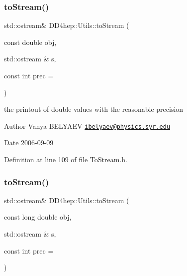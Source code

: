 \subsubsection{\texorpdfstring{to\+Stream()}{toStream()}\hspace{0.1cm}{\footnotesize\ttfamily [6/22]}}
{\footnotesize\ttfamily std\+::ostream\& D\+D4hep\+::\+Utils\+::to\+Stream (\begin{DoxyParamCaption}\item[{const double}]{obj,  }\item[{std\+::ostream \&}]{s,  }\item[{const int}]{prec = {} }\end{DoxyParamCaption})\hspace{0.3cm}{\ttfamily [inline]}}



the printout of double values with the reasonable precision 

\begin{DoxyAuthor}{Author}
Vanya B\+E\+L\+Y\+A\+EV \href{mailto:ibelyaev@physics.syr.edu}{\tt ibelyaev@physics.\+syr.\+edu} 
\end{DoxyAuthor}
\begin{DoxyDate}{Date}
2006-\/09-\/09 
\end{DoxyDate}


Definition at line 109 of file To\+Stream.\+h.

\hypertarget{namespace_d_d4hep_1_1_utils_ac4881c1c93e7105a9f241b2664679409}{}\label{namespace_d_d4hep_1_1_utils_ac4881c1c93e7105a9f241b2664679409} 
\subsubsection{\texorpdfstring{to\+Stream()}{toStream()}\hspace{0.1cm}{\footnotesize\ttfamily [7/22]}}
{\footnotesize\ttfamily std\+::ostream\& D\+D4hep\+::\+Utils\+::to\+Stream (\begin{DoxyParamCaption}\item[{const long double}]{obj,  }\item[{std\+::ostream \&}]{s,  }\item[{const int}]{prec = {} }\end{DoxyParamCaption})\hspace{0.3cm}{\ttfamily [inline]}}



